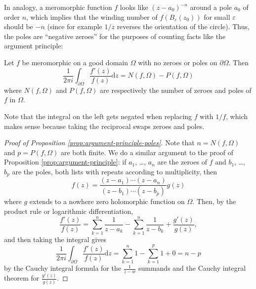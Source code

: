 \documentclass[10pt]{article}
\providecommand{\eps}{\varepsilon}
\providecommand{\dd}{\mathrm d}
\begin{document}
In analogy, a meromorphic function $f$ looks like
$(z-a_0)^{-n}$ around a pole $a_0$ of order $n$,
which implies that the winding number of $f(B_\eps(z_0))$
for small $\eps$ should be $-n$
(since for example $1/z$ reverses the orientation of the circle).
Thus, the poles are ``negative zeroes'' for the purposes
of counting facts like the argument principle:
\begin{prop}
    \label{prop:argument-principle-poles}
    Let $f$ be meromorphic on a good domain $\Omega$
    with no zeroes or poles on $\partial\Omega$. Then
    \begin{equation*}
	\frac 1{2\pi i}\int_{\partial\Omega}\frac{f'(z)}{f(z)}\dd z
	= N(f,\Omega) - P(f,\Omega)
    \end{equation*}
    where $N(f,\Omega)$ and $P(f,\Omega)$ are respectively
    the number of zeroes and poles of $f$ in $\Omega$.
\end{prop}

Note that the integral on the left gets negated
when replacing $f$ with $1/f$, which makes sense
because taking the reciprocal swaps zeroes and poles.

\begin{proof}
    [Proof of Proposition \ref{prop:argument-principle-poles}]
    Note that $n = N(f,\Omega)$ and $p = P(f,\Omega)$ are both finite.
    We do a similar argument to the proof of
    Proposition \ref{prop:argument-principle}:
    if $a_1$, \dots, $a_n$ are the zeroes of $f$
    and $b_1$, \dots, $b_p$ are the poles, both lists
    with repeats according to multiplicity, then
    \begin{equation*}
	f(z) = \frac{(z-a_1)\cdots(z-a_n)}{(z-b_1)\cdots(z-b_p)}g(z)
    \end{equation*}
    where $g$ extends to a nowhere zero holomorphic function on $\Omega$.
    Then, by the product rule or logarithmic differentiation,
    \begin{equation*}
	\frac{f'(z)}{f(z)} = \sum_{k=1}^n\frac 1{z-a_k}
	- \sum_{k=1}^n \frac 1{z-b_k} + \frac{g'(z)}{g(z)},
    \end{equation*}
    and then taking the integral gives
    \begin{equation*}
	\frac 1{2\pi i}\int_{\partial\Omega}\frac{f'(z)}{f(z)}\dd z
	= \sum_{k=1}^n 1 - \sum_{k=1}^p 1 + 0 = n - p
    \end{equation*}
    by the Cauchy integral formula for the $\frac 1{z-w}$ summands
    and the Cauchy integral theorem for $\frac{g'(z)}{g(z)}$.
\end{proof}
\end{document}
